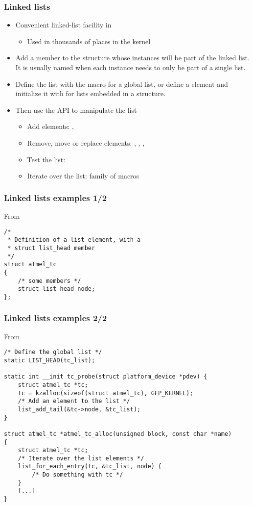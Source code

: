 \begin{frame}
  \frametitle{Linked lists}
  \begin{itemize}
  \item Convenient linked-list facility in 
    \begin{itemize}
    \item Used in thousands of places in the kernel
    \end{itemize}
  \item Add a  member to the structure whose
    instances will be part of the linked list. It is usually named
     when each instance needs to only be part of a single
    list.
  \item Define the list with the  macro for a global
    list, or define a  element and initialize
    it with  for lists embedded in a structure.
  \item Then use the  API to manipulate the list
    \begin{itemize}
    \item Add elements: , 
    \item Remove, move or replace elements: ,
      , ,
    \item Test the list: 
    \item Iterate over the list:  family of macros
    \end{itemize}
  \end{itemize}
\end{frame}

\begin{frame}[fragile]
  \frametitle{Linked lists examples 1/2}
  From 
\begin{verbatim}
/*
 * Definition of a list element, with a
 * struct list_head member
 */
struct atmel_tc
{
    /* some members */
    struct list_head node;
};
\end{verbatim}
\end{frame}

\begin{frame}[fragile]
  \frametitle{Linked lists examples 2/2}
  From 
\begin{verbatim}
/* Define the global list */
static LIST_HEAD(tc_list);

static int __init tc_probe(struct platform_device *pdev) {
    struct atmel_tc *tc;
    tc = kzalloc(sizeof(struct atmel_tc), GFP_KERNEL);
    /* Add an element to the list */
    list_add_tail(&tc->node, &tc_list);
}

struct atmel_tc *atmel_tc_alloc(unsigned block, const char *name)
{
    struct atmel_tc *tc;
    /* Iterate over the list elements */
    list_for_each_entry(tc, &tc_list, node) {
        /* Do something with tc */
    }
    [...]
}
\end{verbatim}
\end{frame}
